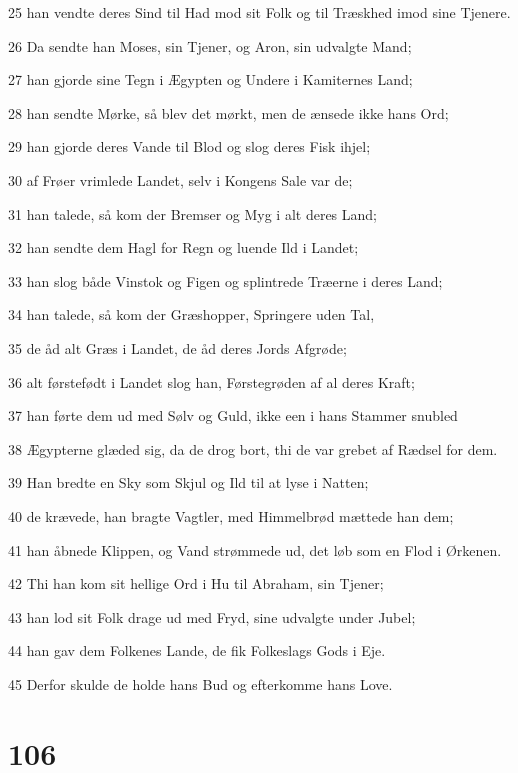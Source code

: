 \par 25 han vendte deres Sind til Had mod sit Folk og til Træskhed imod sine Tjenere.
\par 26 Da sendte han Moses, sin Tjener, og Aron, sin udvalgte Mand;
\par 27 han gjorde sine Tegn i Ægypten og Undere i Kamiternes Land;
\par 28 han sendte Mørke, så blev det mørkt, men de ænsede ikke hans Ord;
\par 29 han gjorde deres Vande til Blod og slog deres Fisk ihjel;
\par 30 af Frøer vrimlede Landet, selv i Kongens Sale var de;
\par 31 han talede, så kom der Bremser og Myg i alt deres Land;
\par 32 han sendte dem Hagl for Regn og luende Ild i Landet;
\par 33 han slog både Vinstok og Figen og splintrede Træerne i deres Land;
\par 34 han talede, så kom der Græshopper, Springere uden Tal,
\par 35 de åd alt Græs i Landet, de åd deres Jords Afgrøde;
\par 36 alt førstefødt i Landet slog han, Førstegrøden af al deres Kraft;
\par 37 han førte dem ud med Sølv og Guld, ikke een i hans Stammer snubled
\par 38 Ægypterne glæded sig, da de drog bort, thi de var grebet af Rædsel for dem.
\par 39 Han bredte en Sky som Skjul og Ild til at lyse i Natten;
\par 40 de krævede, han bragte Vagtler, med Himmelbrød mættede han dem;
\par 41 han åbnede Klippen, og Vand strømmede ud, det løb som en Flod i Ørkenen.
\par 42 Thi han kom sit hellige Ord i Hu til Abraham, sin Tjener;
\par 43 han lod sit Folk drage ud med Fryd, sine udvalgte under Jubel;
\par 44 han gav dem Folkenes Lande, de fik Folkeslags Gods i Eje.
\par 45 Derfor skulde de holde hans Bud og efterkomme hans Love.

\chapter{106}

